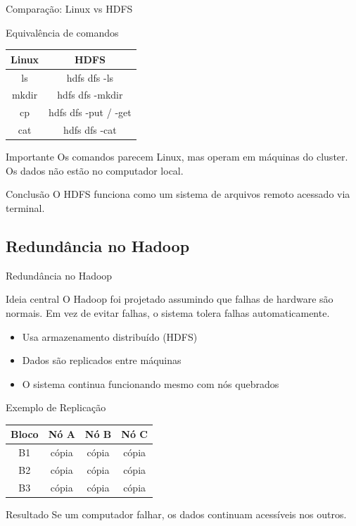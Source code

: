 \documentclass[9pt]{beamer}
\begin{document}
\begin{frame}{Comparação: Linux vs HDFS}

\begin{block}{Equivalência de comandos}

\begin{center}
\begin{tabular}{c|c}
Linux & HDFS \\ \hline
ls & hdfs dfs -ls \\
mkdir & hdfs dfs -mkdir \\
cp & hdfs dfs -put / -get \\
cat & hdfs dfs -cat
\end{tabular}
\end{center}

\end{block}

\begin{block}{Importante}
Os comandos parecem Linux, mas operam em máquinas do cluster.
Os dados não estão no computador local.
\end{block}

\begin{block}{Conclusão}
O HDFS funciona como um sistema de arquivos remoto acessado
via terminal.
\end{block}

\end{frame}
\subsection{Redundância no Hadoop}

\begin{frame}{Redundância no Hadoop}
\begin{block}{Ideia central}
O Hadoop foi projetado assumindo que falhas de hardware são normais.
Em vez de evitar falhas, o sistema tolera falhas automaticamente.
\end{block}

\begin{itemize}
    \item Usa armazenamento distribuído (HDFS)
    \item Dados são replicados entre máquinas
    \item O sistema continua funcionando mesmo com nós quebrados
\end{itemize}
\end{frame}
\begin{frame}{Exemplo de Replicação}

\begin{table}[]
\centering
\begin{tabular}{c|c|c|c}
Bloco & Nó A & Nó B & Nó C \\ \hline
B1 & cópia & cópia & cópia \\
B2 & cópia & cópia & cópia \\
B3 & cópia & cópia & cópia
\end{tabular}
\end{table}

\begin{block}{Resultado}
Se um computador falhar, os dados continuam acessíveis nos outros.
\end{block}
\end{frame}
\end{document}

